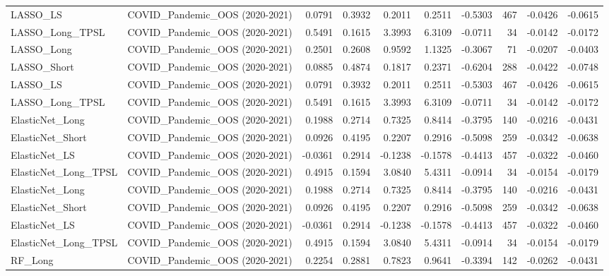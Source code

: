 \begin{tabular}{llrrrrrrrr}
\cline{1-10}
LASSO\_LS & COVID\_Pandemic\_OOS (2020-2021) & 0.0791 & 0.3932 & 0.2011 & 0.2511 & -0.5303 & 467 & -0.0426 & -0.0615 \\
\cline{1-10}
LASSO\_Long\_TPSL & COVID\_Pandemic\_OOS (2020-2021) & 0.5491 & 0.1615 & 3.3993 & 6.3109 & -0.0711 & 34 & -0.0142 & -0.0172 \\
\cline{1-10}
LASSO\_Long & COVID\_Pandemic\_OOS (2020-2021) & 0.2501 & 0.2608 & 0.9592 & 1.1325 & -0.3067 & 71 & -0.0207 & -0.0403 \\
\cline{1-10}
LASSO\_Short & COVID\_Pandemic\_OOS (2020-2021) & 0.0885 & 0.4874 & 0.1817 & 0.2371 & -0.6204 & 288 & -0.0422 & -0.0748 \\
\cline{1-10}
LASSO\_LS & COVID\_Pandemic\_OOS (2020-2021) & 0.0791 & 0.3932 & 0.2011 & 0.2511 & -0.5303 & 467 & -0.0426 & -0.0615 \\
\cline{1-10}
LASSO\_Long\_TPSL & COVID\_Pandemic\_OOS (2020-2021) & 0.5491 & 0.1615 & 3.3993 & 6.3109 & -0.0711 & 34 & -0.0142 & -0.0172 \\
\cline{1-10}
ElasticNet\_Long & COVID\_Pandemic\_OOS (2020-2021) & 0.1988 & 0.2714 & 0.7325 & 0.8414 & -0.3795 & 140 & -0.0216 & -0.0431 \\
\cline{1-10}
ElasticNet\_Short & COVID\_Pandemic\_OOS (2020-2021) & 0.0926 & 0.4195 & 0.2207 & 0.2916 & -0.5098 & 259 & -0.0342 & -0.0638 \\
\cline{1-10}
ElasticNet\_LS & COVID\_Pandemic\_OOS (2020-2021) & -0.0361 & 0.2914 & -0.1238 & -0.1578 & -0.4413 & 457 & -0.0322 & -0.0460 \\
\cline{1-10}
ElasticNet\_Long\_TPSL & COVID\_Pandemic\_OOS (2020-2021) & 0.4915 & 0.1594 & 3.0840 & 5.4311 & -0.0914 & 34 & -0.0154 & -0.0179 \\
\cline{1-10}
ElasticNet\_Long & COVID\_Pandemic\_OOS (2020-2021) & 0.1988 & 0.2714 & 0.7325 & 0.8414 & -0.3795 & 140 & -0.0216 & -0.0431 \\
\cline{1-10}
ElasticNet\_Short & COVID\_Pandemic\_OOS (2020-2021) & 0.0926 & 0.4195 & 0.2207 & 0.2916 & -0.5098 & 259 & -0.0342 & -0.0638 \\
\cline{1-10}
ElasticNet\_LS & COVID\_Pandemic\_OOS (2020-2021) & -0.0361 & 0.2914 & -0.1238 & -0.1578 & -0.4413 & 457 & -0.0322 & -0.0460 \\
\cline{1-10}
ElasticNet\_Long\_TPSL & COVID\_Pandemic\_OOS (2020-2021) & 0.4915 & 0.1594 & 3.0840 & 5.4311 & -0.0914 & 34 & -0.0154 & -0.0179 \\
\cline{1-10}
RF\_Long & COVID\_Pandemic\_OOS (2020-2021) & 0.2254 & 0.2881 & 0.7823 & 0.9641 & -0.3394 & 142 & -0.0262 & -0.0431 \\

\end{tabular}
